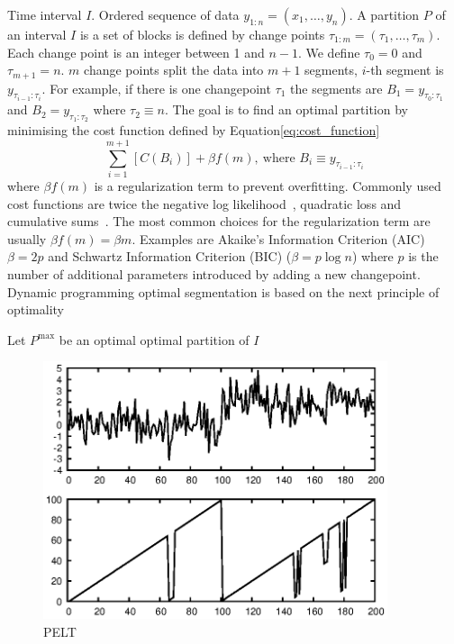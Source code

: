 \documentclass[doctoral,utf8,lot,loar,lof,shortloft,index]{jydiss}
\begin{document}
Time interval $I$.
Ordered sequence of data $y_{1:n}=(x_1,\dots,y_n)$.
A partition $P$ of an interval $I$ is a set of blocks is defined  by change points $\tau_{1:m}=(\tau_1, \dots, \tau_m)$.
Each change point is an integer between 1 and $n-1$.
We define $\tau_0=0$ and $\tau_{m+1}=n$.
$m$ change points split the data into $m+1$ segments, $i$-th segment is $y_{\tau_{i-1} : \tau_i}$.
For example, if there is one changepoint $\tau_1$ the segments are $B_1=y_{\tau_0:\tau_1}$ and $B_2=y_{\tau_1:\tau_2}$ where $\tau_2 \equiv n$.
The goal is to find an optimal partition by minimising the cost function defined by Equation\ref{eq:cost_function}
\begin{equation}\label{eq:cost_function}
	\sum_{i=1}^{m+1} [ C(B_i) ] + \beta f(m),\: \text{where } B_i \equiv y_{\tau_{i-1} : \tau_i}
\end{equation}
where $\beta f(m)$ is a regularization term to prevent overfitting.
Commonly used cost functions are twice the negative log likelihood~\cite{guyon1999underfitting,chen2011parametric},
quadratic loss and cumulative sums~\cite{inclan1994use, rigaill2010pruned}.
The most common choices for the regularization term are usually $\beta f(m) = \beta m$.
Examples are Akaike's Information Criterion (AIC\cite{akaike1974new}) $\beta=2p$ and Schwartz Information Criterion (BIC\cite{schwarz1978estimating}) ($\beta = p \log{n}$) where $p$ is the number of additional parameters introduced by adding a new changepoint.
Dynamic programming optimal segmentation is based on the next principle of optimality
\begin{theorem}
Let $P^{\text{max}}$ be an optimal optimal partition of $I$
\end{theorem}


\begin{figure}[!htb]
	\centering
	\includegraphics[width=0.9\textwidth]{images/example_output_pelt.eps}
	\caption{PELT}\label{fig:pelt_output_example}
\end{figure}
\end{document}
